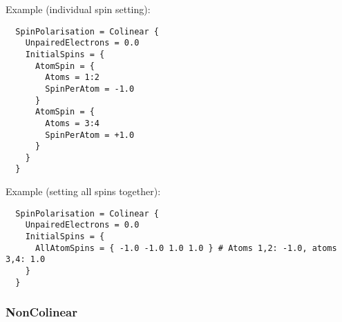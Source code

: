 \begin{description}
Example (individual spin setting):
\invparskip
\begin{verbatim}
  SpinPolarisation = Colinear {
    UnpairedElectrons = 0.0
    InitialSpins = {
      AtomSpin = {
        Atoms = 1:2
        SpinPerAtom = -1.0
      }
      AtomSpin = {
        Atoms = 3:4
        SpinPerAtom = +1.0
      }
    }
  }
\end{verbatim}

Example (setting all spins together):
\invparskip
\begin{verbatim}
  SpinPolarisation = Colinear {
    UnpairedElectrons = 0.0
    InitialSpins = {
      AllAtomSpins = { -1.0 -1.0 1.0 1.0 } # Atoms 1,2: -1.0, atoms 3,4: 1.0
    }
  }
\end{verbatim}
\end{description}

\subsubsection{NonColinear\cb}
\label{sec:dftbp.NonColinear}

